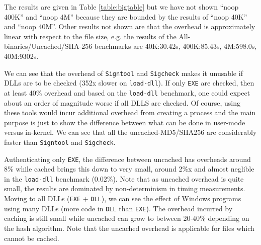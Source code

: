 The results are given in Table \ref{table:bigtable} but
we have not shown ``noop 400K'' and ``noop 4M'' 
because they are bounded by the results of ``noop 40K'' and ``noop 40M''.
Other results not shown are that the overhead is approximately
linear with respect to the file size, e.g.
the results of the All-binaries/Uncached/SHA-256 benchmarks are
40K:30.42s, 400K:85.43s, 4M:598.0s, 40M:9302s.

We can see that the overhead of {\tt Signtool} and {\tt Sigcheck} makes
it unusable if DLLs are to be checked (352x slower on {\tt load-dll}).
If only {\tt EXE} are checked, then at least 40\% overhead and based
on the {\tt load-dll} benchmark, one could expect about an order
of magnitude worse if all DLLS are checked.
Of course, using these tools would incur additional overhead from creating
a process and the main purpose is just to show the difference
between what can be done in user-mode versus in-kernel.
We can see that all the uncached-MD5/SHA256 are considerably faster
than {\tt Signtool} and {\tt Sigcheck}.

Authenticating only {\tt EXE}, the difference between uncached has overheads
around 8\% while cached brings this down to very small, around 2\%x and almost
neglible in the {\tt load-dll} benchmark (0.02\%).
Note that as uncached overhead is quite small, the results are dominated
by non-determinism in timing measurements.
Moving to all DLLs ({\tt EXE} + {\tt DLL}), we can see the effect of Windows
programs using many DLLs (more code in {\tt DLL} than {\tt EXE}).
The overhead incurred by caching is still small while uncached can grow 
to between 20-40\% depending on the hash algorithm.
Note that the uncached overhead is applicable for files which cannot be cached.



